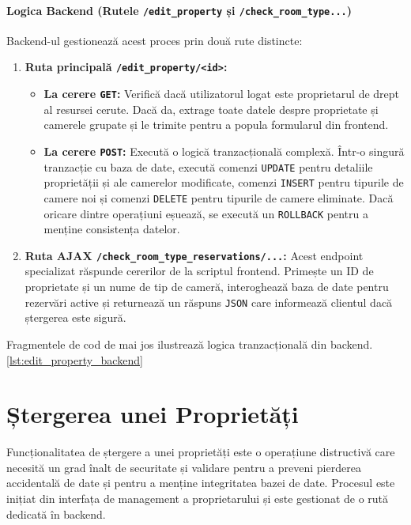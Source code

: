 \documentclass[12pt, a4paper, oneside, romanian]{teza-upb}
\begin{document}
\paragraph{Logica Backend (Rutele \texttt{/edit\_property} și \texttt{/check\_room\_type...})}
Backend-ul gestionează acest proces prin două rute distincte:
\begin{enumerate}
	\item \textbf{Ruta principală \texttt{/edit\_property/<id>}:}
	\begin{itemize}
		\item \textbf{La cerere \texttt{GET}:} Verifică dacă utilizatorul logat este proprietarul de drept al resursei cerute. Dacă da, extrage toate datele despre proprietate și camerele grupate și le trimite pentru a popula formularul din frontend.
		\item \textbf{La cerere \texttt{POST}:} Execută o logică tranzacțională complexă. Într-o singură tranzacție cu baza de date, execută comenzi \texttt{UPDATE} pentru detaliile proprietății și ale camerelor modificate, comenzi \texttt{INSERT} pentru tipurile de camere noi și comenzi \texttt{DELETE} pentru tipurile de camere eliminate. Dacă oricare dintre operațiuni eșuează, se execută un \texttt{ROLLBACK} pentru a menține consistența datelor.
	\end{itemize}
	\item \textbf{Ruta AJAX \texttt{/check\_room\_type\_reservations/...}:} Acest endpoint specializat răspunde cererilor de la scriptul frontend. Primește un ID de proprietate și un nume de tip de cameră, interoghează baza de date pentru rezervări active și returnează un răspuns \texttt{JSON} care informează clientul dacă ștergerea este sigură.
\end{enumerate}


Fragmentele de cod de mai jos ilustrează logica tranzacțională din backend. \ref{lst:edit_property_backend}



\section{Ștergerea unei Proprietăți}
Funcționalitatea de ștergere a unei proprietăți este o operațiune distructivă care necesită un grad înalt de securitate și validare pentru a preveni pierderea accidentală de date și pentru a menține integritatea bazei de date. Procesul este inițiat din interfața de management a proprietarului și este gestionat de o rută dedicată în backend.
\end{document}
